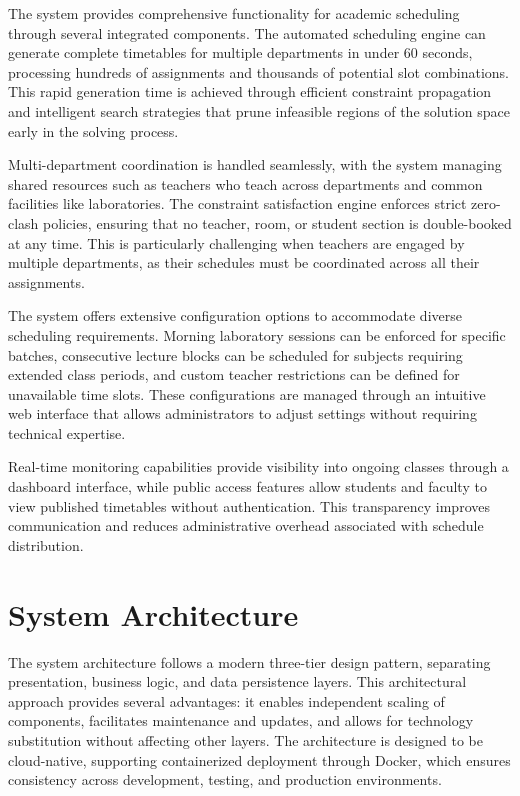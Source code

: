 \documentclass[12pt,a4paper]{article}
\begin{document}
The system provides comprehensive functionality for academic scheduling through several integrated components. The automated scheduling engine can generate complete timetables for multiple departments in under 60 seconds, processing hundreds of assignments and thousands of potential slot combinations. This rapid generation time is achieved through efficient constraint propagation and intelligent search strategies that prune infeasible regions of the solution space early in the solving process.

Multi-department coordination is handled seamlessly, with the system managing shared resources such as teachers who teach across departments and common facilities like laboratories. The constraint satisfaction engine enforces strict zero-clash policies, ensuring that no teacher, room, or student section is double-booked at any time. This is particularly challenging when teachers are engaged by multiple departments, as their schedules must be coordinated across all their assignments.

The system offers extensive configuration options to accommodate diverse scheduling requirements. Morning laboratory sessions can be enforced for specific batches, consecutive lecture blocks can be scheduled for subjects requiring extended class periods, and custom teacher restrictions can be defined for unavailable time slots. These configurations are managed through an intuitive web interface that allows administrators to adjust settings without requiring technical expertise.

Real-time monitoring capabilities provide visibility into ongoing classes through a dashboard interface, while public access features allow students and faculty to view published timetables without authentication. This transparency improves communication and reduces administrative overhead associated with schedule distribution.

\section{System Architecture}

The system architecture follows a modern three-tier design pattern, separating presentation, business logic, and data persistence layers. This architectural approach provides several advantages: it enables independent scaling of components, facilitates maintenance and updates, and allows for technology substitution without affecting other layers. The architecture is designed to be cloud-native, supporting containerized deployment through Docker, which ensures consistency across development, testing, and production environments.
\end{document}

